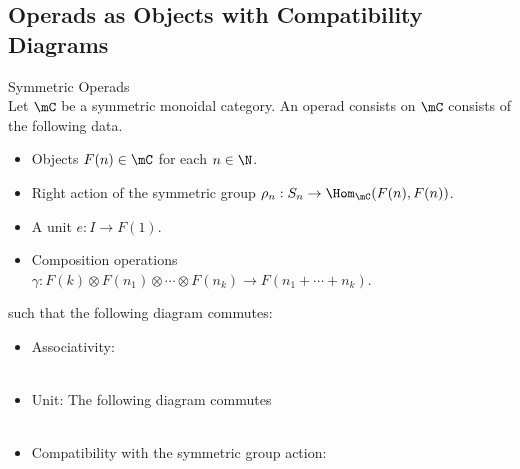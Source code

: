 \documentclass[a4paper]{article}
\begin{document}
\subsection{Operads as Objects with Compatibility Diagrams}
\begin{defn}{Symmetric Operads}{}\\
Let $\mC$ be a symmetric monoidal category. An operad consists on $\mC$ consists of the following data. 
\begin{itemize}
\item Objects $F(n)\in\mC$ for each $n\in\N$. 
\item Right action of the symmetric group $\rho_n:S_n\to\Hom_\mC(F(n),F(n))$. 
\item A unit $e:I\to F(1)$. 
\item Composition operations $\gamma:F(k)\otimes F(n_1)\otimes\cdots\otimes F(n_k)\to F(n_1+\cdots+n_k)$. 
\end{itemize}
such that the following diagram commutes: 
\begin{itemize}
\item Associativity: \\
 \\
\item Unit: The following diagram commutes \\
 \\
\item Compatibility with the symmetric group action: 
\end{itemize}
\end{defn}
\end{document}
